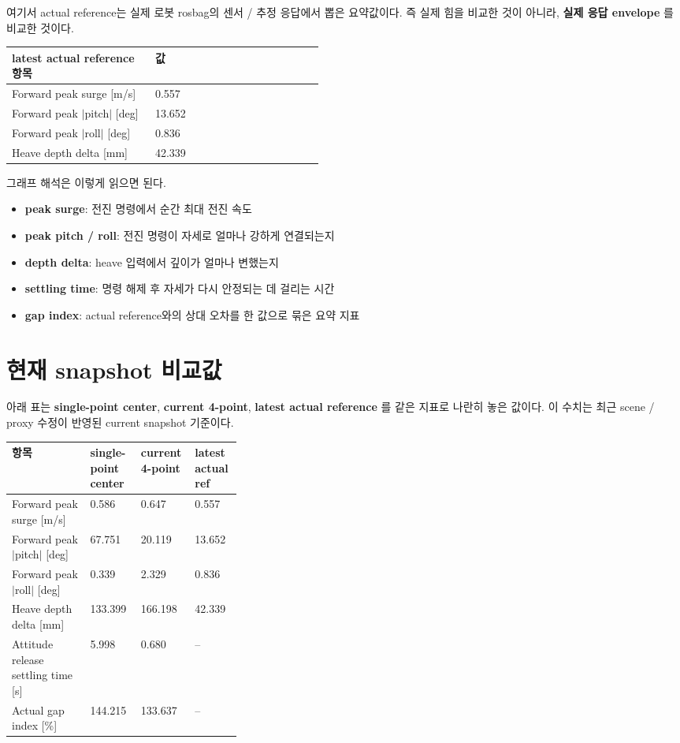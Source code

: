 \documentclass[11pt,a4paper]{article}
\begin{document}
여기서 actual reference는 실제 로봇 rosbag의 센서 / 추정 응답에서 뽑은 요약값이다. 즉 실제 힘을 비교한 것이 아니라, \textbf{실제 응답 envelope} 를 비교한 것이다.

\begin{center}
\small
\begin{tabularx}{\linewidth}{>{\raggedright\arraybackslash}p{0.46\linewidth}Y}
\toprule
latest actual reference 항목 & 값 \\
\midrule
Forward peak surge [m/s] & 0.557 \\
Forward peak $|$pitch$|$ [deg] & 13.652 \\
Forward peak $|$roll$|$ [deg] & 0.836 \\
Heave depth delta [mm] & 42.339 \\
\bottomrule
\end{tabularx}
\end{center}

그래프 해석은 이렇게 읽으면 된다.

\begin{itemize}[leftmargin=2em]
  \item \textbf{peak surge}: 전진 명령에서 순간 최대 전진 속도
  \item \textbf{peak pitch / roll}: 전진 명령이 자세로 얼마나 강하게 연결되는지
  \item \textbf{depth delta}: heave 입력에서 깊이가 얼마나 변했는지
  \item \textbf{settling time}: 명령 해제 후 자세가 다시 안정되는 데 걸리는 시간
  \item \textbf{gap index}: actual reference와의 상대 오차를 한 값으로 묶은 요약 지표
\end{itemize}

\section{현재 snapshot 비교값}

아래 표는 \textbf{single-point center}, \textbf{current 4-point}, \textbf{latest actual reference} 를 같은 지표로 나란히 놓은 값이다. 이 수치는 최근 scene / proxy 수정이 반영된 current snapshot 기준이다.

\begin{center}
\small
\begin{tabularx}{\linewidth}{>{\raggedright\arraybackslash}p{0.34\linewidth}YYY}
\toprule
항목 & single-point center & current 4-point & latest actual ref \\
\midrule
Forward peak surge [m/s] & 0.586 & 0.647 & 0.557 \\
Forward peak $|$pitch$|$ [deg] & 67.751 & 20.119 & 13.652 \\
Forward peak $|$roll$|$ [deg] & 0.339 & 2.329 & 0.836 \\
Heave depth delta [mm] & 133.399 & 166.198 & 42.339 \\
Attitude release settling time [s] & 5.998 & 0.680 & -- \\
Actual gap index [\%] & 144.215 & 133.637 & -- \\
\bottomrule
\end{tabularx}
\end{center}
\end{document}
